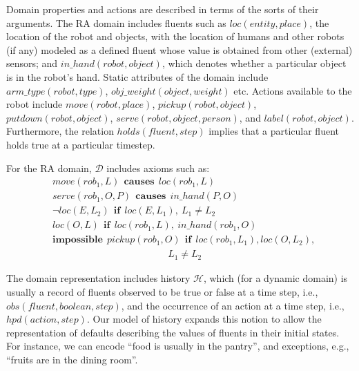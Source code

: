 \documentclass{article}
\begin{document}
Domain properties and actions are described in terms of the sorts of
their arguments. The RA domain includes fluents such as $loc(entity,
place)$, the location of the robot and objects, with the location of
humans and other robots (if any) modeled as a defined fluent whose
value is obtained from other (external) sensors; and $in\_hand(robot,
object)$, which denotes whether a particular object is in the robot's
hand. Static attributes of the domain include $arm\_type(robot,
type)$, $obj\_weight(object, weight)$ etc. Actions available to the
robot include $move(robot, place)$, $pickup(robot, object)$,
$putdown(robot, object)$, $serve(robot, object, person)$, and
$label(robot, object)$.  Furthermore, the relation $holds(fluent,
step)$ implies that a particular fluent holds true at a particular
timestep.

\smallskip
\noindent
For the RA domain, $\mathcal{D}$ includes axioms such as:
\begin{align*}
  &move(rob_1, L)~~\mathbf{causes}~~loc(rob_1, L) \\
  &serve(rob_1, O, P)~~\mathbf{causes}~~in\_hand(P, O)\\
  &\neg loc(E, L_2)~~\mathbf{if}~~loc(E, L_1),~ L_1\neq L_2 \\
  &loc(O, L)~~\mathbf{if}~~ loc(rob_1, L),~in\_hand(rob_1, O)\\
  &\mathbf{impossible}~~pickup(rob_1, O)~~\mathbf{if}~~loc(rob_1,
  L_1), loc(O, L_2),\\ 
  &\qquad~~~~~~~~~~~~~~~~~~~~~~~~~~~~~~~~~~~~~~~~~~~~~L_1\neq L_2
\end{align*}

The domain representation includes history $\mathcal{H}$, which (for a
dynamic domain) is usually a record of fluents observed to be true or
false at a time step, i.e., $obs(fluent, boolean, step)$, and the
occurrence of an action at a time step, i.e., $hpd(action,step)$. Our
model of history expands this notion to allow the representation of
defaults describing the values of fluents in their initial states. For
instance, we can encode ``food is usually in the pantry'', and
exceptions, e.g., ``fruits are in the dining room''.


\end{document}
